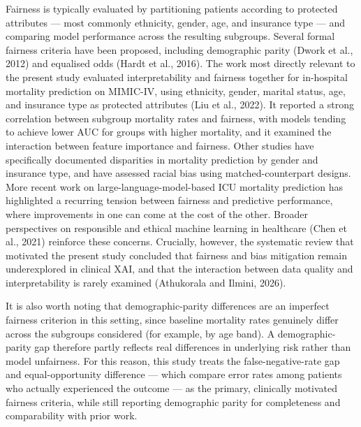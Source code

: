\documentclass[12pt,a4paper]{report}
\begin{document}
Fairness is typically evaluated by partitioning patients according to protected attributes --- most commonly ethnicity, gender, age, and insurance type --- and comparing model performance across the resulting subgroups. Several formal fairness criteria have been proposed, including demographic parity (Dwork et al., 2012) and equalised odds (Hardt et al., 2016). The work most directly relevant to the present study evaluated interpretability and fairness together for in-hospital mortality prediction on MIMIC-IV, using ethnicity, gender, marital status, age, and insurance type as protected attributes (Liu et al., 2022). It reported a strong correlation between subgroup mortality rates and fairness, with models tending to achieve lower AUC for groups with higher mortality, and it examined the interaction between feature importance and fairness. Other studies have specifically documented disparities in mortality prediction by gender and insurance type, and have assessed racial bias using matched-counterpart designs. More recent work on large-language-model-based ICU mortality prediction has highlighted a recurring tension between fairness and predictive performance, where improvements in one can come at the cost of the other. Broader perspectives on responsible and ethical machine learning in healthcare (Chen et al., 2021) reinforce these concerns. Crucially, however, the systematic review that motivated the present study concluded that fairness and bias mitigation remain underexplored in clinical XAI, and that the interaction between data quality and interpretability is rarely examined (Athukorala and Ilmini, 2026).

It is also worth noting that demographic-parity differences are an imperfect fairness criterion in this setting, since baseline mortality rates genuinely differ across the subgroups considered (for example, by age band). A demographic-parity gap therefore partly reflects real differences in underlying risk rather than model unfairness. For this reason, this study treats the false-negative-rate gap and equal-opportunity difference --- which compare error rates among patients who actually experienced the outcome --- as the primary, clinically motivated fairness criteria, while still reporting demographic parity for completeness and comparability with prior work.
\end{document}
